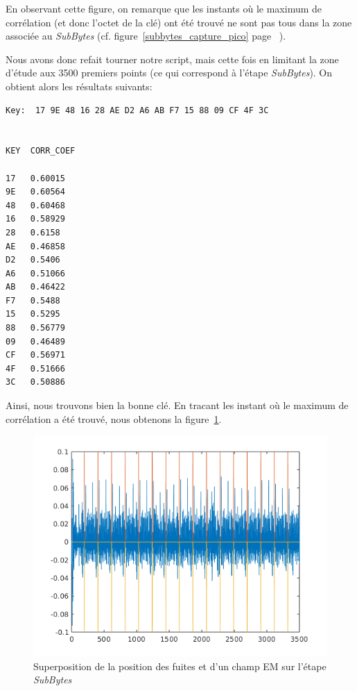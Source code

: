 \documentclass[a4paper, 12pt]{article}
\begin{document}
	En observant cette figure, on remarque que les instants où le maximum de corrélation (et donc l'octet de la clé) ont été trouvé ne sont pas tous dans la zone associée au \emph{SubBytes} (cf. figure~\ref{subbytes_capture_pico} page ~\pageref{subbytes_capture_pico}).
	
	Nous avons donc refait tourner notre script, mais cette fois en limitant la zone d'étude aux 3500 premiers points (ce qui correspond à l'étape \emph{SubBytes}). On obtient alors les résultats suivants:
\begin{lstlisting}
Key:  17 9E 48 16 28 AE D2 A6 AB F7 15 88 09 CF 4F 3C


KEY  CORR_COEF
 	 
17 	 0.60015
9E 	 0.60564
48 	 0.60468
16 	 0.58929
28 	 0.6158
AE 	 0.46858
D2 	 0.5406
A6 	 0.51066
AB 	 0.46422
F7 	 0.5488
15 	 0.5295
88 	 0.56779
09 	 0.46489
CF 	 0.56971
4F 	 0.51666
3C 	 0.50886
\end{lstlisting}
Ainsi, nous trouvons bien la bonne clé. En tracant les instant où le maximum de corrélation a été trouvé, nous obtenons la figure~\ref{reduction_3500_pts}.

\begin{figure}[H]
	\begin{center}
		\includegraphics[scale=1]{images/reduction_3500_pts.png}
		\caption{Superposition de la position des fuites et d'un champ EM sur l'étape \emph{SubBytes}}
		\label{reduction_3500_pts}
	\end{center}
\end{figure}
\end{document}
